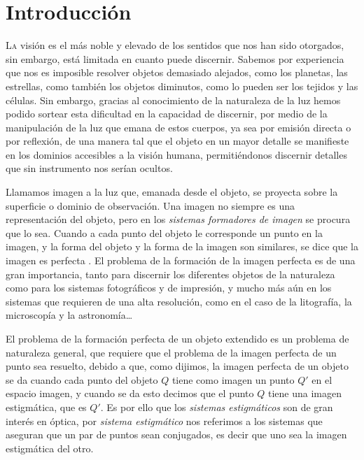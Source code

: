 \chapter*{Introducción}

\lettrine[lines=2]{L}{a} visión es el más noble y elevado de los sentidos que nos han sido otorgados, sin embargo, está limitada en cuanto puede discernir. Sabemos por experiencia que nos es imposible resolver objetos demasiado alejados, como los planetas, las estrellas, como también los objetos diminutos, como lo pueden ser los tejidos y las células. Sin embargo, gracias al conocimiento de la naturaleza de la luz hemos podido sortear esta dificultad en la capacidad de discernir, por medio de la manipulación de la luz que emana de estos cuerpos, ya sea por emisión directa o por reflexión, de una manera tal que el objeto en un mayor detalle se manifieste en los dominios accesibles a la visión humana, permitiéndonos discernir detalles que sin instrumento nos serían ocultos. 

Llamamos imagen a la luz que, emanada desde el objeto, se proyecta sobre la superficie o dominio de observación. Una imagen no siempre es una representación del objeto, pero en los \emph{sistemas formadores de imagen} se procura que lo sea. Cuando a cada punto del objeto le corresponde un punto en la imagen, y la forma del objeto y la forma de la imagen son similares, se dice que la imagen es perfecta \cite[\S 5.2]{bornwolf1999}. El problema de la formación de la imagen perfecta es de una gran importancia, tanto para discernir los diferentes objetos de la naturaleza como para los sistemas fotográficos y de impresión, y mucho más aún en los sistemas que requieren de una alta resolución, como en el caso de la litografía, la microscopía y la astronomía\dots

El problema de la formación perfecta de un objeto extendido es un problema de naturaleza general, que requiere que el problema de la imagen perfecta de un punto sea resuelto, debido a que, como dijimos, la imagen perfecta de un objeto se da cuando cada punto del objeto $Q$ tiene como imagen un punto $Q'$ en el espacio imagen, y cuando se da esto decimos que el punto $Q$ tiene una imagen estigmática, que es $Q'$. Es por ello que los \emph{sistemas estigmáticos} son de gran interés en óptica, por \emph{sistema estigmático} nos referimos a los sistemas que aseguran que un par de puntos sean conjugados, es decir que uno sea la imagen estigmática del otro.

